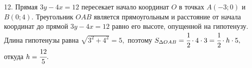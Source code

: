 12. Прямая $3y-4x=12$ пересекает начало координат $O$ в точках $A(-3;0)$ и $B(0;4).$ Треугольник $OAB$ является прямоугольным и расстояние от начала координат до прямой $3y-4x=12$ равно его высоте, опущенной на гипотенузу. Длина гипотенузы равна $\sqrt{3^2+4^2}=5,$ поэтому $S_{\Delta OAB}=\cfrac{1}{2}\cdot4\cdot3=\cfrac{1}{2}\cdot h\cdot5,$ откуда $h=\cfrac{12}{5}.$\\
